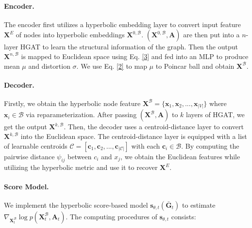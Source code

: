 \documentclass[letterpaper]{article} %
\begin{document}
\paragraph{Encoder.}The encoder first utilizes a hyperbolic embedding layer to convert input feature$\boldsymbol{X}^E$ of nodes into hyperbolic embeddings $\boldsymbol{X}^{0,\mathcal{B}}$. $(\boldsymbol{X}^{0,\mathcal{B}},\boldsymbol{A})$ are then put into a $n$-layer HGAT to learn the structural information of the graph. Then the output $\boldsymbol{X}^{n,\mathcal{B}}$ is mapped to Euclidean space using Eq. \eqref{3} and fed into an MLP to produce mean $\mu$ and distortion $\sigma$. 
We use Eq. \eqref{2} to map $\mu$ to Poincar ball and obtain $\boldsymbol{X}^\mathcal{B}$. 

\paragraph{Decoder.}
Firstly, we obtain the hyperbolic node feature $\boldsymbol{X}^{\mathcal{B}}=\{\boldsymbol{x}_1,\boldsymbol{x}_2,...,\boldsymbol{x}_{|V|}\}$ where $\boldsymbol{x}_{i}\in \mathcal{B}$ via reparameterization. 
After passing $(\boldsymbol{X}^{\mathcal{B}},\boldsymbol{A})$ to $k$ layers of HGAT, we get the output $\boldsymbol{X}^{k,\mathcal{B}}$. Then, the decoder uses a centroid-distance layer \cite{liu2019hyperbolic} to convert $\boldsymbol{X}^{k,\mathcal{B}}$ into the Euclidean space.
The centroid-distance layer is equipped with a list of learnable centroids $\mathcal{C}=[\boldsymbol{c}_1,\boldsymbol{c}_2,...,\boldsymbol{c}_{|\mathcal{C}|}]$ with each $\boldsymbol{c}_{i}\in \mathcal{B}$. 
By computing the pairwise distance $\psi_{ij}$ between $c_i$ and $x_j$, we obtain the Euclidean features while utilizing the hyperbolic metric and use it to recover $\boldsymbol{X}^{E}$.

\paragraph{Score Model.} 
We implement the hyperbolic score-based model $\boldsymbol{s}_{\theta, t}(\boldsymbol{\bar{G}}_{t})$ to estimate $\nabla_{\boldsymbol{X}^\mathcal{B}_{t}} \log p\left(\boldsymbol{X}^\mathcal{B}_{t},\boldsymbol{A}_{t} \right)$. The computing procedures of $\boldsymbol{s}_{\theta, t}$ consists:
\end{document}
